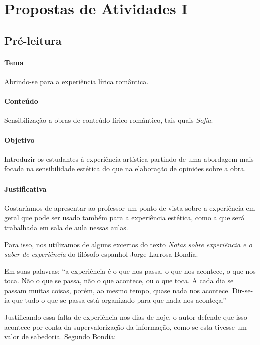 \documentclass[12pt]{extarticle}
\begin{document}
\pagebreak\section{Propostas de Atividades I}

\subsection{Pré-leitura}

\paragraph{Tema} Abrindo-se para a experiência lírica romântica.

\paragraph{Conteúdo} Sensibilização a obras de conteúdo lírico romântico,
tais quais \emph{Sofia}.

\paragraph{Objetivo} Introduzir os estudantes à experiência artística
partindo de uma abordagem mais focada na sensibilidade estética do que
na elaboração de opiniões sobre a obra. 

\paragraph{Justificativa} Gostaríamos de apresentar ao professor um
ponto de vista sobre a experiência em geral que pode ser usado
também para a experiência estética, como a que será trabalhada em 
sala de aula nessas aulas. 

Para isso, nos utilizamos de alguns excertos do texto \emph{Notas sobre
experiência e o saber de experiência} do filósofo espanhol Jorge
Larrosa Bondía. 

Em suas palavras: ``a experiência é o que nos passa, 
o que nos acontece, o que nos toca. Não o que se passa, não o que acontece, ou o que toca. A cada dia se 
passam muitas coisas, porém, ao mesmo tempo, quase nada nos acontece. 
Dir-se-ia que tudo o que se passa está organizado para que nada nos aconteça.''

Justificando essa falta de experiência nos dias de hoje, 
o autor defende que isso acontece por conta da supervalorização
da informação, como se esta tivesse um valor de sabedoria. Segundo Bondía: 
\end{document}
